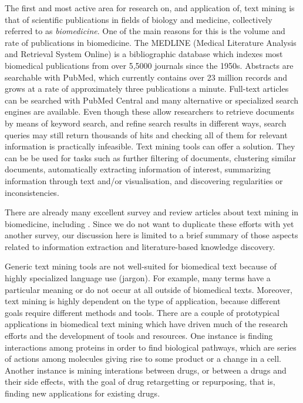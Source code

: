 The first and most active area for research on, and application of, text mining is that of scientific publications in fields of biology and medicine, collectively referred to as \emph{biomedicine}.
One of the main reasons for this is the volume and rate of publications in biomedicine.
The MEDLINE (Medical Literature Analysis and Retrieval System Online) is a bibliographic database which indexes most biomedical publications from over 5,5000 journals since the 1950s.
Abstracts are searchable with PubMed, which currently contains over 23 million records and grows at a rate of approximately three publications a minute.
Full-text articles can be searched with PubMed Central and many alternative or specialized search engines are available. 
Even though these allow researchers to retrieve documents by means of keyword search, and refine search results in different ways, search queries may still return thousands of hits and checking all of them for relevant information is practically infeasible.
Text mining tools can offer a solution.
They can be be used for tasks such as further filtering of documents, clustering similar documents, automatically extracting information of interest, summarizing information through text and/or visualisation, and discovering regularities or inconsistencies.

There are already many excellent survey and review articles about text mining in biomedicine, including
\citep{Neves2012Survey,Simpson2012Biomedical,Andronis2011Literature,Ananiadou2010Event,RodriguezEsteban2009Biomedical,Zweigenbaum2009Advanced,Cohen2008Getting,Zweigenbaum2007Frontiers,Ananiadou2006,Erhardt2006Status,JenEA06,Spasic2005Text,Cohen2005Survey,Krauthammer2004Term,Blake2011Text,Krallinger2010Analysis}.
Since we do not want to duplicate these efforts with yet another survey, our discussion here is limited to a brief summary of those aspects related to information extraction and literature-based knowledge discovery.  

Generic text mining tools are not well-suited for biomedical text because of highly specialized language use (jargon). 
For example, many terms have a particular meaning or do not occur at all outside of biomedical texts.
Moreover, text mining is highly dependent on the type of application, because different goals require different methods and tools.
There are a couple of prototypical applications in biomedical text mining which have driven much of the research efforts and the development of tools and resources.
One instance is finding interactions among proteins in order to find biological pathways, which are series of actions among molecules giving rise to some product or a change in a cell.
Another instance is mining interations between drugs, or between a drugs and their side effects, with the goal of drug retargetting or repurposing, that is, finding new applications for existing drugs.

